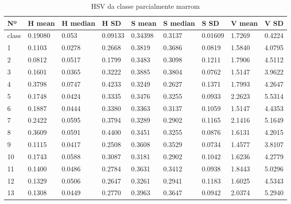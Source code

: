\begin{anexosenv}
\begin{table}[htbp!]
\centering
\caption{HSV da classe parcialmente marrom}
\label{tab:cores_classe_parc_marrom}
\begin{tabular}{|l|l|l|l|l|l|l|l|l|}
\hline
Nº & H mean & H median & H SD & S mean & S median & S SD & V mean & V SD \\ \hline
class & 0.19080 & 0.053       & 0.09133              & 0.34398 & 0.3137   & 0.01609              & 1.7269 & 0.4224               \\\hline
1    & 0.1103  & 0.0278   & 0.2668               & 0.3819  & 0.3686   & 0.0819               & 1.5840 & 4.0795               \\
2    & 0.0812  & 0.0517   & 0.1799               & 0.3483  & 0.3098   & 0.1211               & 1.7906 & 4.5112               \\
3    & 0.1601  & 0.0365   & 0.3222               & 0.3885  & 0.3804   & 0.0762               & 1.5147 & 3.9622               \\
4    & 0.3798  & 0.0747   & 0.4233               & 0.3249  & 0.2627   & 0.1371               & 1.7993 & 4.2647               \\
5    & 0.1748  & 0.0424   & 0.3335               & 0.3476  & 0.3255   & 0.0933               & 2.2623 & 5.5314               \\
6    & 0.1887  & 0.0444   & 0.3380               & 0.3363  & 0.3137   & 0.1059               & 1.5147 & 4.4353               \\
7    & 0.2422  & 0.0595   & 0.3794               & 0.3289  & 0.2902   & 0.1165               & 2.1416 & 5.1649               \\
8    & 0.3609  & 0.0591   & 0.4400               & 0.3451  & 0.3255   & 0.0876               & 1.6131 & 4.2015               \\
9    & 0.1115  & 0.0417   & 0.2508               & 0.3608  & 0.3529   & 0.0734               & 1.4577 & 3.8107               \\
10   & 0.1743  & 0.0588   & 0.3087               & 0.3181  & 0.2902   & 0.1042               & 1.6236 & 4.2779               \\
11   & 0.1400  & 0.0486   & 0.2784               & 0.3631  & 0.3412   & 0.0938               & 1.8443 & 5.0296               \\
12   & 0.1329  & 0.0506   & 0.2647               & 0.3261  & 0.2941   & 0.1183               & 1.6025 & 4.5343               \\
13   & 0.1308  & 0.0449   & 0.2770               & 0.3963  & 0.3647   & 0.0942               & 2.0374 & 5.2940               \\

\end{tabular}
\end{table}
\end{anexosenv}
